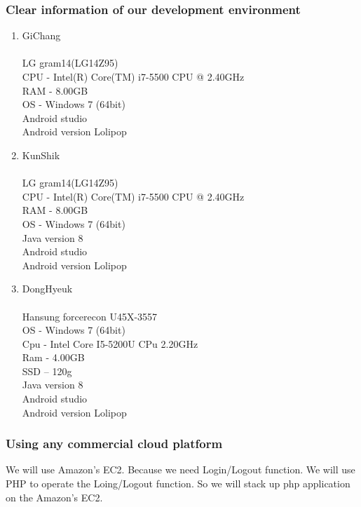 \documentclass[12pt]{article}
\begin{document}
\subsubsection{Clear information of  our development environment}
\begin{enumerate}
\item GiChang\\
\\LG gram14(LG14Z95)\\
CPU - Intel(R) Core(TM) i7-5500 CPU @ 2.40GHz\\
RAM - 8.00GB\\
OS - Windows 7 (64bit)\\
Android studio\\
Android version Lolipop\\

\item KunShik\\
\\LG gram14(LG14Z95)\\
CPU - Intel(R) Core(TM) i7-5500 CPU @ 2.40GHz\\
RAM - 8.00GB\\
OS - Windows 7 (64bit)\\
Java version 8\\
Android studio \\
Android version Lolipop\\

\item DongHyeuk\\
\\Hansung forcerecon U45X-3557\\
OS - Windows 7 (64bit)\\
Cpu - Intel Core I5-5200U CPu 2.20GHz\\
Ram - 4.00GB\\
SSD – 120g\\
Java version 8\\
Android studio \\
Android version Lolipop
\\

\end{enumerate}

\subsubsection{Using any commercial cloud platform}
We will use Amazon’s EC2. Because we need Login/Logout function. We will use PHP to operate the Loing/Logout function. So we will stack up php application on the Amazon’s EC2.
\end{document}
